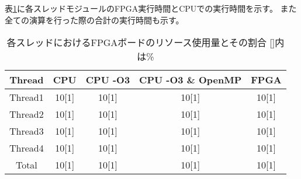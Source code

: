{表\ref{table:exec_time}に各スレッドモジュールのFPGA実行時間とCPUでの実行時間を示す。
また全ての演算を行った際の合計の実行時間も示す。

\begin{table}[p]
    \begin{center}
    \caption{各スレッドにおけるFPGAボードのリソース使用量とその割合 []内は\%}
    \label{table:exec_time}
    \begin{tabular}{|c|c|c|c|c|} \hline
    \multicolumn{1}{|c|}{Thread} & \multicolumn{1}{|c|}{CPU} & \multicolumn{1}{|c|}{CPU -O3} & \multicolumn{1}{|c|}{CPU -O3 \& OpenMP} & \multicolumn{1}{|c|}{FPGA} \\ \hline \hline
    Thread1       & 10[1] & 10[1] & 10[1] & 10[1] \\ \hline
    Thread2       & 10[1] & 10[1] & 10[1] & 10[1] \\ \hline
    Thread3       & 10[1] & 10[1] & 10[1] & 10[1] \\ \hline
    Thread4       & 10[1] & 10[1] & 10[1] & 10[1] \\ \hline
    Total       & 10[1] & 10[1] & 10[1] & 10[1] \\ \hline
    \end{tabular}
    \end{center}
\end{table}
}
